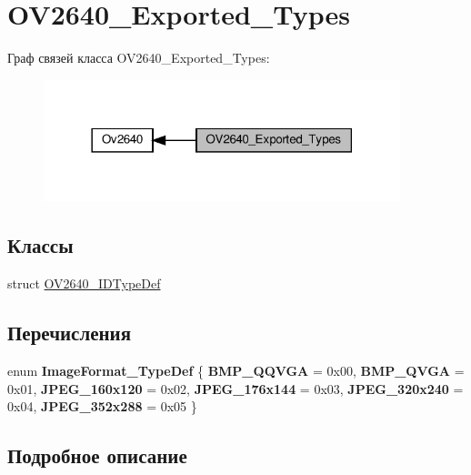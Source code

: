 \hypertarget{group___o_v2640___exported___types}{}\section{O\+V2640\+\_\+\+Exported\+\_\+\+Types}
\label{group___o_v2640___exported___types}
Граф связей класса O\+V2640\+\_\+\+Exported\+\_\+\+Types\+:
\nopagebreak
\begin{figure}[H]
\begin{center}
\leavevmode
\includegraphics[width=294pt]{group___o_v2640___exported___types}
\end{center}
\end{figure}
\subsection*{Классы}
\begin{DoxyCompactItemize}
\item 
struct \hyperlink{struct_o_v2640___i_d_type_def}{O\+V2640\+\_\+\+I\+D\+Type\+Def}
\end{DoxyCompactItemize}
\subsection*{Перечисления}
\begin{DoxyCompactItemize}
\item 
\mbox{\label{group___o_v2640___exported___types_gab2f6e1880b1b71937c63bcab8f14fa0c}} 
enum {\bfseries Image\+Format\+\_\+\+Type\+Def} \{ \newline
{\bfseries B\+M\+P\+\_\+\+Q\+Q\+V\+GA} = 0x00, 
{\bfseries B\+M\+P\+\_\+\+Q\+V\+GA} = 0x01, 
{\bfseries J\+P\+E\+G\+\_\+160x120} = 0x02, 
{\bfseries J\+P\+E\+G\+\_\+176x144} = 0x03, 
\newline
{\bfseries J\+P\+E\+G\+\_\+320x240} = 0x04, 
{\bfseries J\+P\+E\+G\+\_\+352x288} = 0x05
 \}
\end{DoxyCompactItemize}


\subsection{Подробное описание}
